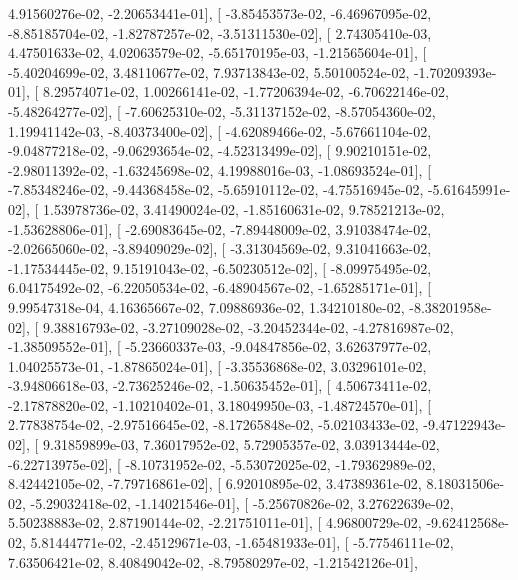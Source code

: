 \documentclass{article}
\begin{document}
          4.91560276e-02,  -2.20653441e-01],
       [ -3.85453573e-02,  -6.46967095e-02,  -8.85185704e-02,
         -1.82787257e-02,  -3.51311530e-02],
       [  2.74305410e-03,   4.47501633e-02,   4.02063579e-02,
         -5.65170195e-03,  -1.21565604e-01],
       [ -5.40204699e-02,   3.48110677e-02,   7.93713843e-02,
          5.50100524e-02,  -1.70209393e-01],
       [  8.29574071e-02,   1.00266141e-02,  -1.77206394e-02,
         -6.70622146e-02,  -5.48264277e-02],
       [ -7.60625310e-02,  -5.31137152e-02,  -8.57054360e-02,
          1.19941142e-03,  -8.40373400e-02],
       [ -4.62089466e-02,  -5.67661104e-02,  -9.04877218e-02,
         -9.06293654e-02,  -4.52313499e-02],
       [  9.90210151e-02,  -2.98011392e-02,  -1.63245698e-02,
          4.19988016e-03,  -1.08693524e-01],
       [ -7.85348246e-02,  -9.44368458e-02,  -5.65910112e-02,
         -4.75516945e-02,  -5.61645991e-02],
       [  1.53978736e-02,   3.41490024e-02,  -1.85160631e-02,
          9.78521213e-02,  -1.53628806e-01],
       [ -2.69083645e-02,  -7.89448009e-02,   3.91038474e-02,
         -2.02665060e-02,  -3.89409029e-02],
       [ -3.31304569e-02,   9.31041663e-02,  -1.17534445e-02,
          9.15191043e-02,  -6.50230512e-02],
       [ -8.09975495e-02,   6.04175492e-02,  -6.22050534e-02,
         -6.48904567e-02,  -1.65285171e-01],
       [  9.99547318e-04,   4.16365667e-02,   7.09886936e-02,
          1.34210180e-02,  -8.38201958e-02],
       [  9.38816793e-02,  -3.27109028e-02,  -3.20452344e-02,
         -4.27816987e-02,  -1.38509552e-01],
       [ -5.23660337e-03,  -9.04847856e-02,   3.62637977e-02,
          1.04025573e-01,  -1.87865024e-01],
       [ -3.35536868e-02,   3.03296101e-02,  -3.94806618e-03,
         -2.73625246e-02,  -1.50635452e-01],
       [  4.50673411e-02,  -2.17878820e-02,  -1.10210402e-01,
          3.18049950e-03,  -1.48724570e-01],
       [  2.77838754e-02,  -2.97516645e-02,  -8.17265848e-02,
         -5.02103433e-02,  -9.47122943e-02],
       [  9.31859899e-03,   7.36017952e-02,   5.72905357e-02,
          3.03913444e-02,  -6.22713975e-02],
       [ -8.10731952e-02,  -5.53072025e-02,  -1.79362989e-02,
          8.42442105e-02,  -7.79716861e-02],
       [  6.92010895e-02,   3.47389361e-02,   8.18031506e-02,
         -5.29032418e-02,  -1.14021546e-01],
       [ -5.25670826e-02,   3.27622639e-02,   5.50238883e-02,
          2.87190144e-02,  -2.21751011e-01],
       [  4.96800729e-02,  -9.62412568e-02,   5.81444771e-02,
         -2.45129671e-03,  -1.65481933e-01],
       [ -5.77546111e-02,   7.63506421e-02,   8.40849042e-02,
         -8.79580297e-02,  -1.21542126e-01],
\end{document}
